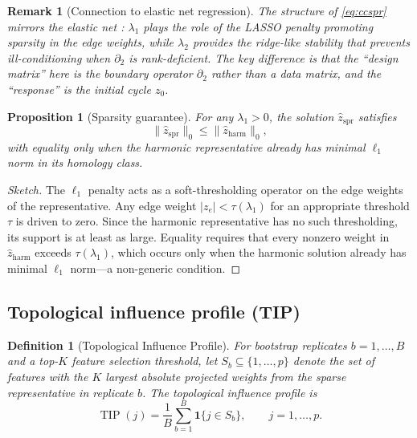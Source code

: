 \documentclass[11pt]{article}
\newtheorem{proposition}[theorem]{Proposition}
\newtheorem{definition}[theorem]{Definition}
\newtheorem{remark}[theorem]{Remark}
\DeclareMathOperator{\TIP}{TIP}
\begin{document}
\begin{remark}[Connection to elastic net regression]\label{rem:elasticnet}
The structure of \eqref{eq:ccspr} mirrors the elastic net \cite{zou2005elasticnet}: $\lambda_1$ plays the role of the LASSO penalty promoting sparsity in the edge weights, while $\lambda_2$ provides the ridge-like stability that prevents ill-conditioning when $\partial_2$ is rank-deficient.
The key difference is that the ``design matrix'' here is the boundary operator $\partial_2$ rather than a data matrix, and the ``response'' is the initial cycle $z_0$.
\end{remark}

\begin{proposition}[Sparsity guarantee]\label{prop:sparsity}
For any $\lambda_1 > 0$, the solution $\hat{z}_{\mathrm{spr}}$ satisfies
\[
\|\hat{z}_{\mathrm{spr}}\|_0 \le \|\hat{z}_{\mathrm{harm}}\|_0,
\]
with equality only when the harmonic representative already has minimal $\ell_1$ norm in its homology class.
\end{proposition}

\begin{proof}[Sketch]
The $\ell_1$ penalty acts as a soft-thresholding operator on the edge weights of the representative.
Any edge weight $|z_e| < \tau(\lambda_1)$ for an appropriate threshold $\tau$ is driven to zero.
Since the harmonic representative has no such thresholding, its support is at least as large.
Equality requires that every nonzero weight in $\hat{z}_{\mathrm{harm}}$ exceeds $\tau(\lambda_1)$, which occurs only when the harmonic solution already has minimal $\ell_1$ norm---a non-generic condition.
\end{proof}

\subsection{Topological influence profile (TIP)}
\label{sec:tip}

\begin{definition}[Topological Influence Profile]\label{def:tip}
For bootstrap replicates $b = 1, \ldots, B$ and a top-$K$ feature selection threshold, let $S_b \subseteq \{1, \ldots, p\}$ denote the set of features with the $K$ largest absolute projected weights from the sparse representative in replicate $b$.
The \emph{topological influence profile} is
\[
\TIP(j) = \frac{1}{B} \sum_{b=1}^B \mathbf{1}\{j \in S_b\}, \qquad j = 1, \ldots, p.
\]
\end{definition}
\end{document}
